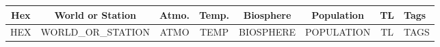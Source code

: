 \documentclass[10pt,letterpaper]{article}
\begin{document}
\begin{tabularx}{\textwidth}{ | c | c | c c c c c X |}
    \hline
    Hex & World or Station & Atmo. & Temp. & Biosphere & Population & TL & Tags \\
    \hline
    HEX & WORLD_OR_STATION & ATMO & TEMP & BIOSPHERE & POPULATION & TL & TAGS \\
    \hline
\end{tabularx}
\end{document}
